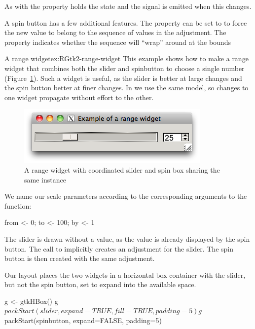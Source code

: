As with  the  property holds the state and
the  signal is emitted when this changes.

A spin button has a few additional features. The property
 can be set to  to force the new value
to belong to the sequence of values in the adjustment. The 
property indicates whether the sequence will ``wrap'' around at the
bounds

\begin{example}{A range widget}{ex:RGtk2-range-widget}
This example shows how to make a range widget that combines both the
slider and spinbutton to choose a single number
(Figure~\ref{fig:RGtk2-range-widget}). Such a widget is useful, as the
slider is better at large changes and the spin button better at finer
changes. In \GTK\/ we use the same  model, so
changes to one widget propagate without effort to the other.

\begin{figure}
  \centering
  \includegraphics[width=.5\textwidth]{fig-RGtk2-range-widget.png}
  \caption{A range widget with coordinated slider and spin box sharing the same  instance}
  \label{fig:RGtk2-range-widget}
\end{figure}


We name our scale parameters according to the corresponding arguments
to the  function:
\begin{Schunk}
\begin{Sinput}
 from <- 0; to <- 100; by <- 1
\end{Sinput}
\end{Schunk}

The slider is drawn without a value, as the value is already displayed
by the spin button. The call to  implicitly
creates an adjustment for the slider. The spin button is then created
with the same adjustment.
\begin{Schunk}
\end{Schunk}
%
Our layout places the two widgets in a horizontal box container with
the slider, but not the spin button, set to expand into the available
space.
\begin{Schunk}
\begin{Sinput}
 g <- gtkHBox()
 g$packStart(slider, expand=TRUE, fill=TRUE, padding=5)
 g$packStart(spinbutton, expand=FALSE, padding=5)
\end{Sinput}
\end{Schunk}


\end{example}


